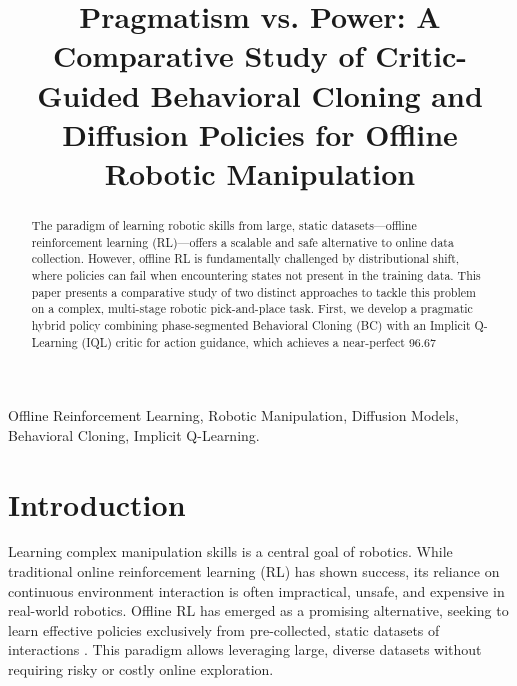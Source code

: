 \documentclass[conference]{IEEEtran}
\title{Pragmatism vs. Power: A Comparative Study of Critic-Guided Behavioral Cloning and Diffusion Policies for Offline Robotic Manipulation}
\author{
\IEEEauthorblockN{Srinivas}
\IEEEauthorblockA{\textit{Lossfunk Labs} \\
Bangalore, India \\
srinivas@lossfunk.com}
}
\begin{document}
\maketitle

\begin{abstract}
The paradigm of learning robotic skills from large, static datasets—offline reinforcement learning (RL)—offers a scalable and safe alternative to online data collection. However, offline RL is fundamentally challenged by distributional shift, where policies can fail when encountering states not present in the training data. This paper presents a comparative study of two distinct approaches to tackle this problem on a complex, multi-stage robotic pick-and-place task. First, we develop a pragmatic hybrid policy combining phase-segmented Behavioral Cloning (BC) with an Implicit Q-Learning (IQL) critic for action guidance, which achieves a near-perfect 96.67%
\end{abstract}

\begin{IEEEkeywords}
Offline Reinforcement Learning, Robotic Manipulation, Diffusion Models, Behavioral Cloning, Implicit Q-Learning.
\end{IEEEkeywords}

\section{Introduction}

Learning complex manipulation skills is a central goal of robotics. While traditional online reinforcement learning (RL) has shown success, its reliance on continuous environment interaction is often impractical, unsafe, and expensive in real-world robotics. Offline RL has emerged as a promising alternative, seeking to learn effective policies exclusively from pre-collected, static datasets of interactions \cite{offline_rl_survey}. This paradigm allows leveraging large, diverse datasets without requiring risky or costly online exploration.
\end{document}
